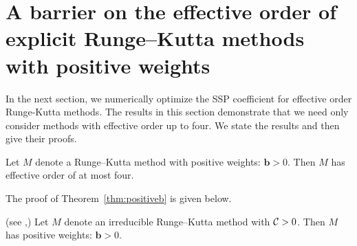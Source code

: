 \section{A barrier on the effective order of explicit Runge--Kutta methods with positive weights}\label{sec:ExRK_barrier}
In the next section, we numerically optimize the SSP coefficient for effective order Runge-Kutta
methods.  The results in this section demonstrate that we need only consider methods with effective
order up to four.  We state the results and then give their proofs.


\begin{theorem}\label{thm:positiveb}
    Let $M$ denote a Runge--Kutta method with positive weights: $\bm{b}>0$.
    Then $M$ has effective order of at most four.
\end{theorem}
The proof of Theorem~\ref{thm:positiveb} is given below.

\begin{lemma}\label{lem:positiveb}(see \cite[Theorem~4.2]{Kraaijevanger1991},\cite[Lemma 4.2]{Ruuth2002})
Let $M$ denote an irreducible Runge--Kutta method with $\mathcal{C}>0$.  Then $M$ has positive weights:
$\bm{b}>0$.
\end{lemma}

